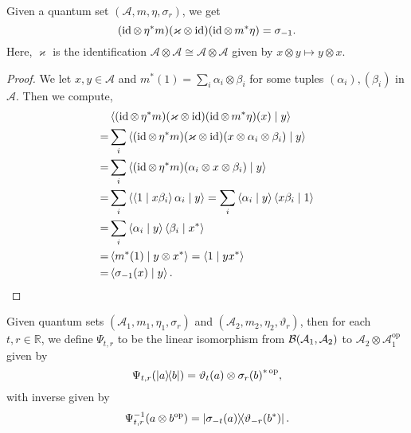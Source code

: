 \begin{proposition}\label{modAut_neg_one_eq_right_twist}
  \leanok
  Given a quantum set $(\mathcal{A},m,\eta,\sigma_r)$, we get
  \[(\operatorname{id}\otimes\,\eta^*m)(\varkappa\otimes\operatorname{id})(\operatorname{id}\otimes\,m^*\eta)=\sigma_{-1}.\]
  Here, $\varkappa$ is the identification $\mathcal{A}\otimes\mathcal{A}\cong\mathcal{A}\otimes\mathcal{A}$ given by $x\otimes y\mapsto y\otimes x$.
 \end{proposition}
 \begin{proof}\leanok
  We let $x,y\in\mathcal{A}$ and $m^*(1)=\sum_i\alpha_i\otimes\beta_i$ for some tuples $(\alpha_i),(\beta_i)$ in $\mathcal{A}$. Then we compute,
  \begin{align*}
   & \left\langle(\operatorname{id}\otimes\,\eta^*m)(\varkappa\otimes\operatorname{id})(\operatorname{id}\otimes\,m^*\eta)(x) \mid y\right\rangle\\
   =& \sum_i\left\langle(\operatorname{id}\otimes\,\eta^*m)(\varkappa\otimes\operatorname{id})(x\otimes\alpha_i\otimes\beta_i) \mid y\right\rangle\\
   =& \sum_i\left\langle(\operatorname{id}\otimes\,\eta^*m)(\alpha_i\otimes x\otimes\beta_i) \mid y\right\rangle\\
   =& \sum_i\left\langle\left\langle1 \mid x\beta_i\right\rangle\alpha_i \mid y\right\rangle = \sum_i\left\langle\alpha_i \mid y\right\rangle\left\langle x\beta_i \mid 1\right\rangle\\
   =& \sum_i\left\langle\alpha_i \mid y\right\rangle\left\langle\beta_i \mid x^*\right\rangle\\
   =& \left\langle m^*(1) \mid y\otimes x^*\right\rangle=\left\langle1 \mid yx^*\right\rangle\\
   =& \left\langle\sigma_{-1}(x) \mid y\right\rangle.
  \end{align*}
 \end{proof}

 \begin{definition}\label{QuantumSet.Psi}
  \leanok
  Given quantum sets $(\mathcal{A}_1,m_1,\eta_1,\sigma_r)$ and $(\mathcal{A}_2,m_2,\eta_2,\vartheta_r)$, then for each $t,r\in\mathbb{R}$, we define $\Psi_{t,r}$ to be the linear isomorphism from $\mathcal{B}(\mathcal{A}_1,\mathcal{A}_2)$ to $\mathcal{A}_2\otimes\mathcal{A}_1^{\operatorname{op}}$ given by
  \[\Psi_{t,r}(\left\lvert a\right\rangle\!\!\left\langle b\right\rvert)=\vartheta_t(a)\otimes{\sigma_r(b)}^{*\operatorname{op}},\]
  with inverse given by
  \[\Psi_{t,r}^{-1}(a\otimes b^{\operatorname{op}})=\left\lvert\sigma_{-t}(a)\right\rangle\!\!\left\langle\vartheta_{-r}(b^*)\right\rvert.\]
 \end{definition}